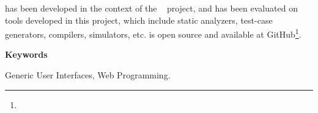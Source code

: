 \ei has been developed in the context of the \envisage~\cite{envisage}
project, and has been evaluated on tools developed in this project,
which include static analyzers, test-case generators, compilers,
simulators, etc. \ei is open source and available at
GitHub\footnote{\eigithub}.


\vspace{1cm}


\begin{center}
{\bf \Large Keywords}
\end{center}

\vspace{0.5cm}
   
Generic User Interfaces, Web Programming.

   

